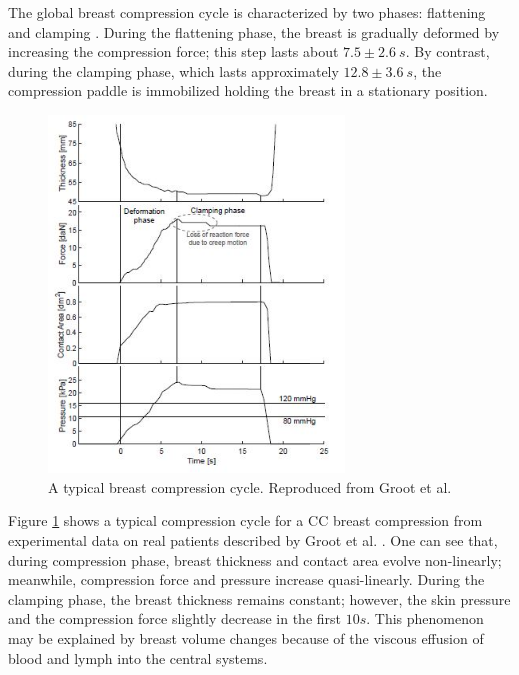 The global breast compression cycle is characterized by two phases: flattening and clamping \citep{de_pain_2015}. During the flattening phase, the breast is gradually deformed by increasing the compression force; this step lasts about  $7.5 \pm 2.6\ s$. By contrast, during the clamping phase, which lasts approximately $12.8 \pm 3.6\ s$, the compression paddle is immobilized holding the breast in a stationary position. 
\begin{figure}[!h]
\centering
\includegraphics[width=0.7\textwidth,keepaspectratio]{figures/breast_compression_cycle.jpg} 
\caption{A typical breast compression cycle. Reproduced from Groot et al. \citep{groot_towards_2015}}\label{fig:breast_compression_cycle}
\end{figure}

Figure \ref{fig:breast_compression_cycle} shows a typical compression cycle for a CC breast compression from experimental data on real patients described by Groot et al. \citep{de_pain_2015}. One can see that, during compression phase, breast thickness and contact area evolve non-linearly; meanwhile, compression force and pressure increase quasi-linearly. During the clamping phase, the breast thickness remains constant; however, the skin pressure and the compression force slightly decrease in the first $10s$. This phenomenon may be explained by breast volume changes because of the viscous effusion of blood and lymph into the central systems. 

